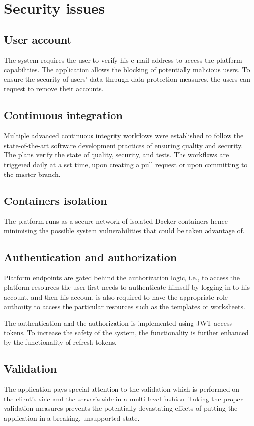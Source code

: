 \documentclass[a4paper,twoside,12pt]{book}
\begin{document}
\section{Security issues}

\subsection{User account}
The system requires the user to verify his e-mail address to access the platform capabilities. The application allows the blocking of potentially malicious users. To ensure the security of users' data through data protection measures, the users can request to remove their accounts.

\subsection{Continuous integration}
Multiple advanced continuous integrity workflows were established to follow the state-of-the-art software development practices of ensuring quality and security. The plans verify the state of quality, security, and tests. The workflows are triggered daily at a set time, upon creating a pull request or upon committing to the master branch.

\subsection{Containers isolation}
The platform runs as a secure network of isolated Docker containers hence minimising the possible system vulnerabilities that could be taken advantage of.

\subsection{Authentication and authorization}
Platform endpoints are gated behind the authorization logic, i.e., to access the platform resources the user first needs to authenticate himself by logging in to his account, and then his account is also required to have the appropriate role authority to access the particular resources such as the templates or worksheets.

The authentication and the authorization is implemented using JWT access tokens. To increase the safety of the system, the functionality is further enhanced by the functionality of refresh tokens.

\subsection{Validation}
The application pays special attention to the validation which is performed on the client's side and the server's side in a multi-level fashion. Taking the proper validation measures prevents the potentially devastating effects of putting the application in a breaking, unsupported state.
\end{document}
